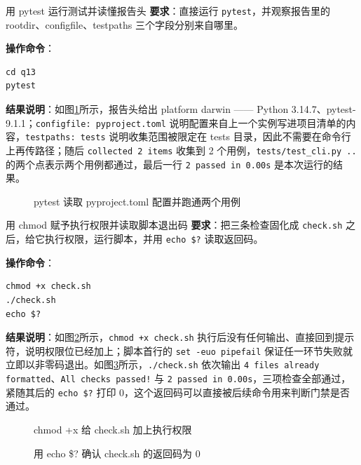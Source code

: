 \begin{exercise}{用 pytest 运行测试并读懂报告头}
\textbf{要求}：直接运行 \verb|pytest|，并观察报告里的 rootdir、configfile、testpaths 三个字段分别来自哪里。

\textbf{操作命令}：
\begin{lstlisting}
cd q13
pytest
\end{lstlisting}

\textbf{结果说明}：如图\ref{fig:ms4-04}所示，报告头给出 platform darwin —— Python 3.14.7、pytest-9.1.1；\verb|configfile: pyproject.toml| 说明配置来自上一个实例写进项目清单的内容，\verb|testpaths: tests| 说明收集范围被限定在 tests 目录，因此不需要在命令行上再传路径；随后 \texttt{collected 2 items} 收集到 2 个用例，\verb|tests/test_cli.py ..| 的两个点表示两个用例都通过，最后一行 \texttt{2 passed in 0.00s} 是本次运行的结果。

\begin{figure}[H]
    \centering
    \caption{pytest 读取 pyproject.toml 配置并跑通两个用例}
    \label{fig:ms4-04}
\end{figure}
\end{exercise}

\begin{exercise}{用 chmod 赋予执行权限并读取脚本退出码}
\textbf{要求}：把三条检查固化成 \verb|check.sh| 之后，给它执行权限，运行脚本，并用 \verb|echo $?| 读取返回码。

\textbf{操作命令}：
\begin{lstlisting}
chmod +x check.sh
./check.sh
echo $?
\end{lstlisting}

\textbf{结果说明}：如图\ref{fig:ms4-05a}所示，\verb|chmod +x check.sh| 执行后没有任何输出、直接回到提示符，说明权限位已经加上；脚本首行的 \texttt{set -euo pipefail} 保证任一环节失败就立即以非零码退出。如图\ref{fig:ms4-05b}所示，\verb|./check.sh| 依次输出 \texttt{4 files already formatted}、\texttt{All checks passed!} 与 \texttt{2 passed in 0.00s}，三项检查全部通过，紧随其后的 \verb|echo $?| 打印 0，这个返回码可以直接被后续命令用来判断门禁是否通过。

\begin{figure}[H]
    \centering
    \caption{chmod +x 给 check.sh 加上执行权限}
    \label{fig:ms4-05a}
\end{figure}

\begin{figure}[H]
    \centering
    \caption{用 echo \$? 确认 check.sh 的返回码为 0}
    \label{fig:ms4-05b}
\end{figure}
\end{exercise}

